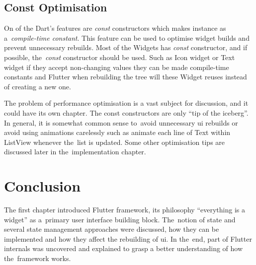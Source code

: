 \subsection{Const Optimisation}
On of the Dart's features are \textit{const} constructors which makes instance as a~\textit{compile-time constant}. This feature can be used to optimise widget builds and prevent unnecessary rebuilds. Most of the Widgets has \textit{const} constructor, and if possible, the~\textit{const} constructor should be used. Such as Icon widget or Text widget if they accept non-changing values they can be made compile-time constants and Flutter when rebuilding the tree will these Widget reuses instead of creating a new one. 

The problem of performance optimisation is a vast subject for discussion, and it could have its own chapter. The const constructors are only ``tip of the iceberg''. In general, it is somewhat common sense to~avoid unnecessary \gls{ui} rebuilds or avoid using animations carelessly such as animate each line of Text within ListView whenever the~list is updated. Some other optimisation tips are discussed later in the~implementation chapter. 

\section{Conclusion}
The first chapter introduced Flutter framework, its philosophy ``everything is a widget'' as a~primary user interface building block. The~notion of state and several state management approaches were discussed, how they can be implemented and how they affect the rebuilding of \gls{ui}. In the~end, part of Flutter internals was uncovered and explained to grasp a better understanding of how the~framework works.